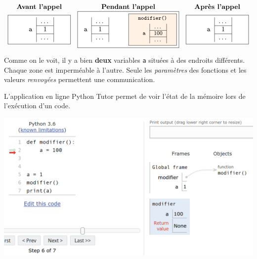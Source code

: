 \documentclass[a4paper,17pt]{extarticle}
\begin{document}
\begin{reponse}
\[
\begin{array}{ccc}
\textbf{Avant l'appel}
&
\textbf{Pendant l'appel}
&
\textbf{Après l'appel}
\\  
\fcolorbox{black}{white}{\parbox{3cm}{\centering
    \begin{tabular}{r|c|}
    & \ldots \\ \cline{2-2}
    \texttt{a} & $1$ \\ \cline{2-2}
    & \ldots 
    \end{tabular}
}}
&
\fcolorbox{black}{white}{\parbox{5cm}{\centering
    \begin{tabular}{r|c|}
    & \ldots \\ \cline{2-2}
    \texttt{a} & $1$ \\ \cline{2-2}
    & \ldots 
    \end{tabular}
    \hfill
    \fcolorbox{black}{orange!10}{\parbox{2.25cm}{\centering\footnotesize
        \texttt{modifier()}\\[.5em]
        \begin{tabular}{r|c|}
        & \ldots \\ \cline{2-2}
        \texttt{a} & $100$ \\ \cline{2-2}
        & \ldots 
    \end{tabular}
    }}
}}
&
\fcolorbox{black}{white}{\parbox{3cm}{\centering
    \begin{tabular}{r|c|}
    & \ldots \\ \cline{2-2}
    \texttt{a} & $1$ \\ \cline{2-2}
    & \ldots 
    \end{tabular}
}}\\ 
\end{array}
\]

Comme on le voit, il y a bien \textbf{deux} variables \texttt{a} situées
à des endroits différents. Chaque zone est imperméable à l'autre. Seule
les \emph{paramètres} des fonctions et les valeurs \emph{renvoyées}
permettent une communication.

        \end{reponse}\begin{remarque}
    L'application en ligne Python Tutor permet de voir l'état de la mémoire
lors de l'exécution d'un code.

\begin{center}
    \includegraphics[width=0.75\linewidth]{img-var.png}
\end{center}


\end{remarque}
\end{document}
